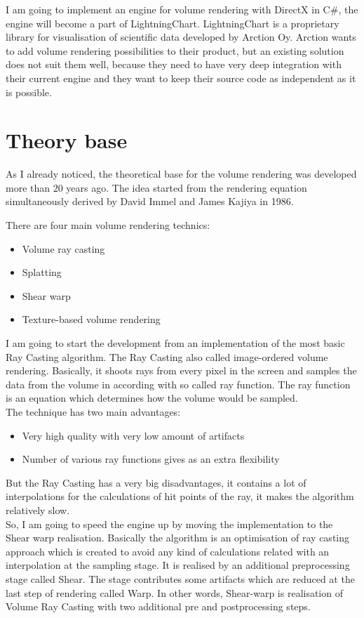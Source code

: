\documentclass[english]{article}
\begin{document}
I am going to implement an engine for volume rendering with DirectX in C\#, the engine will become a part of LightningChart. LightningChart is a proprietary library for visualisation of scientific data developed by Arction Oy. Arction wants to add volume rendering possibilities to their product, but an existing solution does not suit them well, because they need to have very deep integration with their current engine and they want to keep their source code as independent as it is possible.

\section{Theory base}

As I already noticed, the theoretical base for the volume rendering was developed more than 20 years ago. The idea started from the rendering equation simultaneously derived by David Immel and James Kajiya in 1986.

There are four main volume rendering technics:
\begin{itemize}
\item Volume ray casting
\item Splatting
\item Shear warp
\item Texture-based volume rendering
\end{itemize}

I am going to start the development from an implementation of the most basic Ray Casting algorithm. The Ray Casting also called image-ordered volume rendering. Basically, it shoots rays from every pixel in the screen and samples the data from the volume in according with so called ray function. The ray function is an equation which determines how the volume would be sampled.\\

The technique has two main advantages:
\begin{itemize}
\item Very high quality with very low amount of artifacts
\item Number of various ray functions gives as an extra flexibility
\end{itemize}

But the Ray Casting has a very big disadvantages, it contains a lot of interpolations for the calculations of hit points of the ray, it makes the algorithm relatively slow.\\

So, I am going to speed the engine up by moving the implementation to the Shear warp realisation. Basically the algorithm is an optimisation of ray casting approach which is created to avoid any kind of calculations related with an interpolation at the sampling stage. It is realised by an additional preprocessing stage called Shear. The stage contributes some artifacts which are reduced at the last step of rendering called Warp. In other words, Shear-warp is realisation of Volume Ray Casting with two additional pre and postprocessing steps.\\
\end{document}
